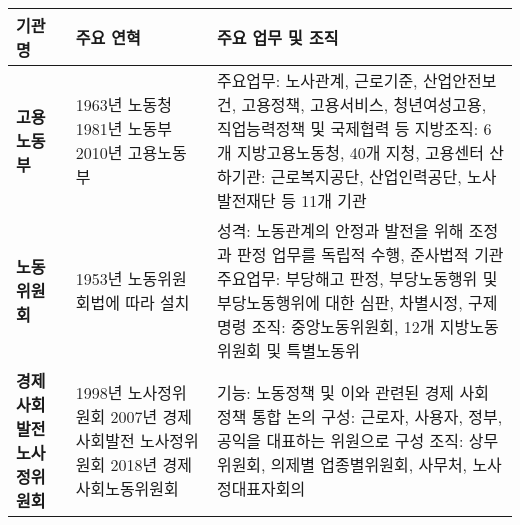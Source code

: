 \begin{tabular}{p{1.6cm}|p{4.4cm}|p{8cm}}
\toprule
\textbf{기관명} & \textbf{주요 연혁} & \textbf{주요 업무 및 조직} \\ \midrule
\textbf{고용노동부} & 
1963년 노동청 \newline
1981년 노동부 \newline
2010년 고용노동부 & 
주요업무: 노사관계, 근로기준, 산업안전보건, 고용정책, 고용서비스, 청년여성고용, 직업능력정책 및 국제협력 등 \newline
지방조직: 6개 지방고용노동청, 40개 지청, 고용센터 \newline
산하기관: 근로복지공단, 산업인력공단, 노사발전재단 등 11개 기관 \\ \hline

\textbf{노동위원회} & 
1953년 노동위원회법에 따라 설치 & 
성격: 노동관계의 안정과 발전을 위해 조정과 판정 업무를 독립적 수행, 준사법적 기관 \newline
주요업무: 부당해고 판정, 부당노동행위 및 부당노동행위에 대한 심판, 차별시정, 구제명령 \newline
조직: 중앙노동위원회, 12개 지방노동위원회 및 특별노동위 \\ \hline

\textbf{경제사회발전} \newline \textbf{노사정위원회} & 
1998년 노사정위원회 \newline
2007년 경제사회발전 노사정위원회 \newline
2018년 경제사회노동위원회 & 
기능: 노동정책 및 이와 관련된 경제 사회 정책 통합 논의 \newline
구성: 근로자, 사용자, 정부, 공익을 대표하는 위원으로 구성 \newline
조직: 상무위원회, 의제별 업종별위원회, 사무처, 노사정대표자회의 \\ \bottomrule

\end{tabular}
